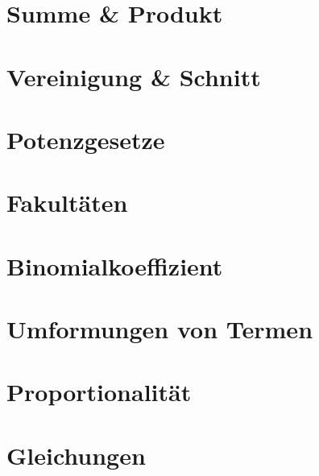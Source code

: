 \section{Summe \& Produkt}\label{sec:summe-und-produkt}


\section{Vereinigung \& Schnitt}\label{sec:vereinigung-und-schnitt}


\section{Potenzgesetze}\label{sec:potenzgesetze}


\section{Fakultäten}\label{sec:fakultaten}


\section{Binomialkoeffizient}\label{sec:binominialkoeffizient}


\section{Umformungen von Termen}\label{sec:umformungen-von-termen}


\section{Proportionalität}\label{sec:proportionalitat}


\section{Gleichungen}\label{sec:gleichungen}

